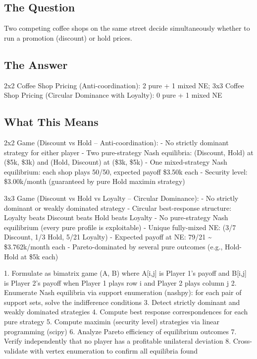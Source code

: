\documentclass[11pt, a4paper]{article}
\begin{document}
\subsection{The Question}
Two competing coffee shops on the same street decide simultaneously whether to run a promotion (discount) or hold prices.

\subsection{The Answer}

\begin{polyainsight}[title={Bottom Line}]
2x2 Coffee Shop Pricing (Anti-coordination): 2 pure + 1 mixed NE; 3x3 Coffee Shop Pricing (Circular Dominance with Loyalty): 0 pure + 1 mixed NE
\end{polyainsight}

\subsection{What This Means}

2x2 Game (Discount vs Hold -- Anti-coordination):
- No strictly dominant strategy for either player
- Two pure-strategy Nash equilibria: (Discount, Hold) at (\$5k, \$3k) and (Hold, Discount) at (\$3k, \$5k)
- One mixed-strategy Nash equilibrium: each shop plays 50/50, expected payoff \$3.50k each
- Security level: \$3.00k/month (guaranteed by pure Hold maximin strategy)

3x3 Game (Discount vs Hold vs Loyalty -- Circular Dominance):
- No strictly dominant or weakly dominated strategy
- Circular best-response structure: Loyalty beats Discount beats Hold beats Loyalty
- No pure-strategy Nash equilibrium (every pure profile is exploitable)
- Unique fully-mixed NE: (3/7 Discount, 1/3 Hold, 5/21 Loyalty)
- Expected payoff at NE: 79/21 \textasciitilde{} \$3.762k/month each
- Pareto-dominated by several pure outcomes (e.g., Hold-Hold at \$5k each)

1. Formulate as bimatrix game (A, B) where A[i,j] is Player 1's payoff and B[i,j] is Player 2's payoff when Player 1 plays row i and Player 2 plays column j
2. Enumerate Nash equilibria via support enumeration (nashpy): for each pair of support sets, solve the indifference conditions
3. Detect strictly dominant and weakly dominated strategies
4. Compute best response correspondences for each pure strategy
5. Compute maximin (security level) strategies via linear programming (scipy)
6. Analyze Pareto efficiency of equilibrium outcomes
7. Verify independently that no player has a profitable unilateral deviation
8. Cross-validate with vertex enumeration to confirm all equilibria found
\end{document}
